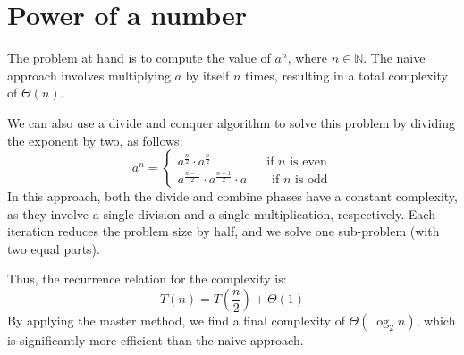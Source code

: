 \section{Power of a number}

The problem at hand is to compute the value of $a^n$, where $n\in\mathbb{N}$. 
The naive approach involves multiplying $a$ by itself $n$ times, resulting in a total complexity of $\Theta(n)$. 

We can also use a divide and conquer algorithm to solve this problem by dividing the exponent by two, as follows:
\[a^n=\begin{cases} a^\frac{n}{2}\cdot a^\frac{n}{2}  \:\:\qquad\qquad \text{if }n\text{ is even} \\ a^\frac{n-1}{2}\cdot a^\frac{n-1}{2} \cdot a \qquad \text{if }n\text{ is odd} \end{cases}\]
In this approach, both the divide and combine phases have a constant complexity, as they involve a single division and a single multiplication, respectively. 
Each iteration reduces the problem size by half, and we solve one sub-problem (with two equal parts).

Thus, the recurrence relation for the complexity is:
\[T(n)=T\left(\dfrac{n}{2}\right)+\Theta(1)\]
By applying the master method, we find a final complexity of $\Theta(\log_2n)$, which is significantly more efficient than the naive approach.